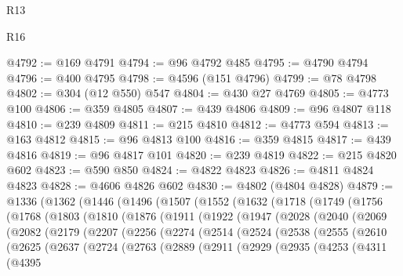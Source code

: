 \begin{lexlean}{R13}
\begin{lexlean}{R16}
\begin{coremodule}
{{{{{{{{{{{{{{{{{{{{{{{{{{{{{{{{{{{{{{{{{{{{{{{{{{{{{{{{{{{{{{{{{{{{{{{{{{{{{{{{{{{{{{{{{{{{{{{{{{{{{{{{{{{{{{{{{@4792 := @169 @4791
@4794 := @96 @4792 @485
@4795 := @4790 @4794
@4796 := @400 @4795
@4798 := @4596 (@151 @4796)
@4799 := @78 @4798
@4802 := @304 (@12 @550) @547
@4804 := @430 @27 @4769
@4805 := @4773 @100
@4806 := @359 @4805
@4807 := @439 @4806
@4809 := @96 @4807 @118
@4810 := @239 @4809
@4811 := @215 @4810
@4812 := @4773 @594
@4813 := @163 @4812
@4815 := @96 @4813 @100
@4816 := @359 @4815
@4817 := @439 @4816
@4819 := @96 @4817 @101
@4820 := @239 @4819
@4822 := @215 @4820 @602
@4823 := @590 @850
@4824 := @4822 @4823
@4826 := @4811 @4824 @4823
@4828 := @4606 @4826 @602
@4830 := @4802 (@4804 @4828)
@4879 := @1336
    (@1362
      (@1446
        (@1496
          (@1507
            (@1552
              (@1632
                (@1718
                  (@1749
                    (@1756
                      (@1768
                        (@1803
                          (@1810
                            (@1876
                              (@1911
                                (@1922
                                  (@1947
                                    (@2028
                                      (@2040
                                        (@2069
                                          (@2082
                                            (@2179
                                              (@2207
                                                (@2256
                                                  (@2274
                                                    (@2514
                                                      (@2524
                                                        (@2538
                                                          (@2555
                                                            (@2610
                                                              (@2625
                                                                (@2637
                                                                  (@2724
                                                                    (@2763
                                                                      (@2889
                                                                        (@2911
                                                                          (@2929
                                                                            (@2935
                                                                              (@4253
                                                                                (@4311
                                                                                  (@4395
}}}}}}}}}}}}}}}}}}}}}}}}}}}}}}}}}}}}}}}}}}}}}}}}}}}}}}}}}}}}}}}}}}}}}}}}}}}}}}}}}}}}}}}}}}}}}}}}}}}}}}}}}}}}}}}}}
\end{coremodule}
\end{lexlean}
\end{lexlean}
